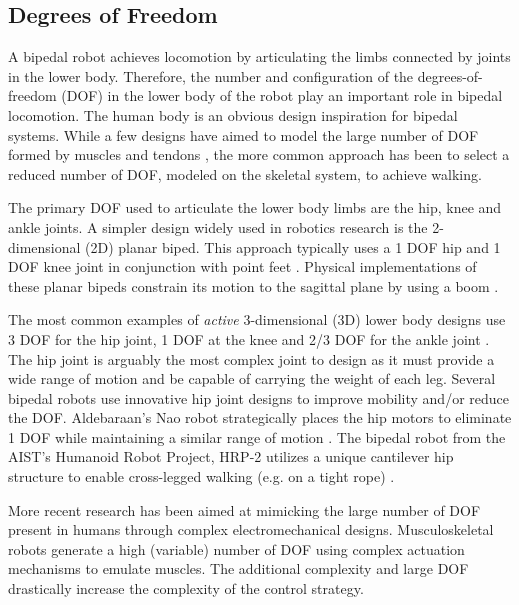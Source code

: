 \subsection{Degrees of Freedom} %
\label{sub:related_degrees_of_freedom}
A bipedal robot achieves locomotion by articulating the limbs connected by joints in the lower body. Therefore, the number and configuration of the degrees-of-freedom (DOF) in the lower body of the robot play an important role in bipedal locomotion. The human body is an obvious design inspiration for bipedal systems. While a few designs have aimed to model the large number of DOF formed by muscles and tendons \cite{Mizuuchi:2007em,Osada:2010cj}, the more common approach has been to select a reduced number of DOF, modeled on the skeletal system, to achieve walking. 

The primary DOF used to articulate the lower body limbs are the hip, knee and ankle joints. A simpler design widely used in robotics research is the 2-dimensional (2D) planar biped. This approach typically uses a 1 DOF hip and 1 DOF knee joint in conjunction with point feet \cite{tzafestas1996robust}. Physical implementations of these planar bipeds constrain its motion to the sagittal plane by using a boom \cite{chevallereau2000design,pratt2001virtual,Wight:2008vt}. 

The most common examples of \emph{active} 3-dimensional (3D) lower body designs use 3 DOF for the hip joint, 1 DOF at the knee and 2/3 DOF for the ankle joint \cite{Hirai1998,IllWooPark:2005et,Kaneko:2004wq,Ogura:2006bm,yamaguchi1999}. The hip joint is arguably the most complex joint to design as it must provide a wide range of motion and be capable of carrying the weight of each leg. Several bipedal robots use innovative hip joint designs to improve mobility and/or reduce the DOF. Aldebaraan's Nao robot strategically places the hip motors to eliminate 1 DOF while maintaining a similar range of motion \cite{Gouaillier:2008ug}. The bipedal robot from the AIST's Humanoid Robot Project, HRP-2 utilizes a unique cantilever hip structure to enable cross-legged walking (e.g. on a tight rope) \cite{Kaneko:2004wq}. 

More recent research has been aimed at mimicking the large number of DOF present in humans through complex electromechanical designs. Musculoskeletal robots \cite{Mizuuchi:2007em,Osada:2010cj} generate a high (variable) number of DOF using complex actuation mechanisms to emulate muscles. The additional complexity and large DOF drastically increase the complexity of the control strategy. 

